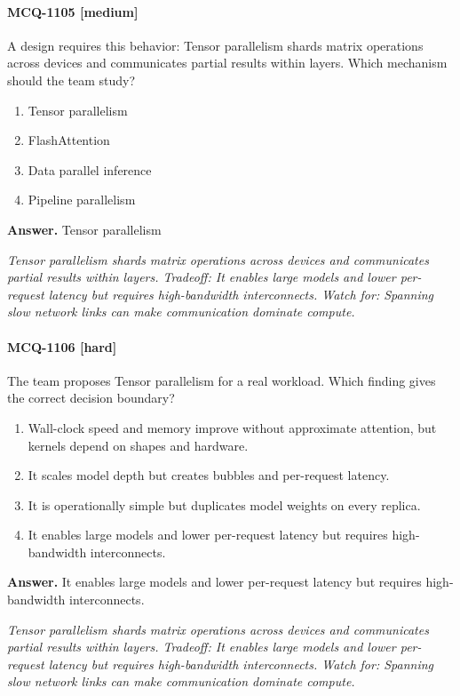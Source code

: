 \paragraph{MCQ-1105 [medium]} A design requires this behavior: Tensor parallelism shards matrix operations across devices and communicates partial results within layers. Which mechanism should the team study?
\begin{enumerate}[label=\Alph*.]
\item Tensor parallelism
\item FlashAttention
\item Data parallel inference
\item Pipeline parallelism
\end{enumerate}
\noindent\textbf{Answer.} Tensor parallelism
\par\textit{Tensor parallelism shards matrix operations across devices and communicates partial results within layers. Tradeoff: It enables large models and lower per-request latency but requires high-bandwidth interconnects. Watch for: Spanning slow network links can make communication dominate compute.}
\paragraph{MCQ-1106 [hard]} The team proposes Tensor parallelism for a real workload. Which finding gives the correct decision boundary?
\begin{enumerate}[label=\Alph*.]
\item Wall-clock speed and memory improve without approximate attention, but kernels depend on shapes and hardware.
\item It scales model depth but creates bubbles and per-request latency.
\item It is operationally simple but duplicates model weights on every replica.
\item It enables large models and lower per-request latency but requires high-bandwidth interconnects.
\end{enumerate}
\noindent\textbf{Answer.} It enables large models and lower per-request latency but requires high-bandwidth interconnects.
\par\textit{Tensor parallelism shards matrix operations across devices and communicates partial results within layers. Tradeoff: It enables large models and lower per-request latency but requires high-bandwidth interconnects. Watch for: Spanning slow network links can make communication dominate compute.}

